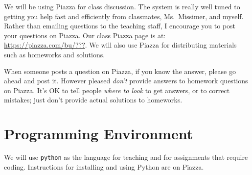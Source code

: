 \documentclass[11pt]{article}
\begin{document}
We will be using Piazza for class discussion. The system is really well
tuned to getting you help fast and efficiently from classmates, Ms.\ Missimer,
and myself. Rather than emailing questions to the teaching staff,
I encourage you to post your questions on Piazza.   Our class Piazza
page  is at: \url{https://piazza.com/bu/???}. 
We will also use Piazza for distributing materials
such as homeworks and solutions.

When someone posts a question on Piazza, if you know the answer, please
go ahead and post it.   However pleased \emph{don't} provide answers to homework
questions on Piazza.   It's OK to tell people \emph{where to look} to
get answers, or to correct mistakes;  just don't provide actual solutions
to homeworks.

\section*{Programming Environment}

We will use \texttt{python} as the language for teaching and for
assignments that require coding.    Instructions for installing and
using Python are on Piazza.





\end{document}

